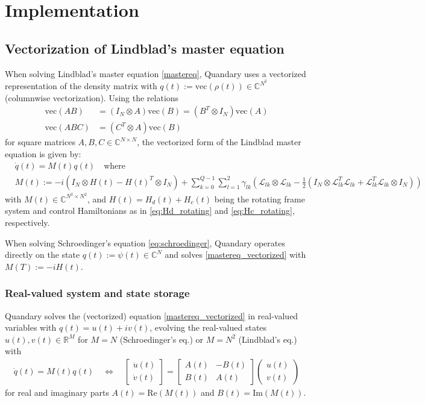 \documentclass[11pt]{article}
\newcommand{\Ell}{\mathcal{L}}
\newcommand{\R}{\mathds{R}}
\newcommand{\C}{\mathds{C}}
\begin{document}
\section{Implementation}

  \subsection{Vectorization of Lindblad's master equation}
  When solving Lindblad's master equation \eqref{mastereq}, Quandary uses a vectorized representation of the density matrix with $q(t) := \text{vec}(\rho(t)) \in \C^{N^2}$ (columnwise vectorization). Using the
  relations
  \begin{align}
   \text{vec}(AB) &= (I_N\otimes A)\text{vec}(B) = (B^T\otimes I_N)\text{vec}(A)
    \\
   \text{vec}(ABC) &= (C^T\otimes A)\text{vec}(B)
  \end{align}
  for square matrices $A,B,C\in\C^{N\times N}$, the vectorized
  form of the Lindblad master equation is given by:
  \begin{align}\label{mastereq_vectorized}
    &\dot q(t) = M(t) q(t) \quad  \text{where} \\
    &M(t) := -i(I_N\otimes H(t) - H(t)^T \otimes I_N) + \sum_{k=0}^{Q-1}\sum_{l=1}^2 \gamma_{lk}
    \left( \Ell_{lk}\otimes \Ell_{lk} - \frac 1 2 \left( I_N\otimes
    \Ell^T_{lk}\Ell_{lk} + \Ell^T_{lk}\Ell_{lk} \otimes I_N \right) \right)
  \end{align}
   with $M(t) \in \C^{N^2\times N^2}$, and $H(t) = H_d(t) + H_c(t)$ being the rotating frame system and control Hamiltonians as in \eqref{eq:Hd_rotating} and \eqref{eq:Hc_rotating}, respectively.

   When solving Schroedinger's equation \eqref{eq:schroedinger}, Quandary operates directly on the state $q(t) := \psi(t)\in\C^N$ and solves \eqref{mastereq_vectorized} with $M(T) := -iH(t)$.
    
  \subsubsection{Real-valued system and state storage}
   Quandary solves the (vectorized) equation \eqref{mastereq_vectorized} in
   real-valued variables with $q(t) = u(t) + iv(t)$, evolving the real-valued
   states $u(t), v(t)\in \R^{M}$ for $M=N$ (Schroedinger's eq.) or $M=N^2$ (Lindblad's eq.) with
   \begin{align}
     \dot q(t) = M(t) q(t) \quad \Leftrightarrow \quad \begin{bmatrix} \dot u(t) \\ \dot v(t) \end{bmatrix} = 
   \begin{bmatrix} A(t) & -B(t) \\ B(t) & A(t) \end{bmatrix} 
   \begin{pmatrix} u(t) \\ v(t) \end{pmatrix} 
   \label{realvaluedODE}
   \end{align}
   for real and imaginary parts $A(t) = \mbox{Re} \left(M(t)\right)$ and $B(t) = \mbox{Im}\left(M(t)\right)$. 
\end{document}
